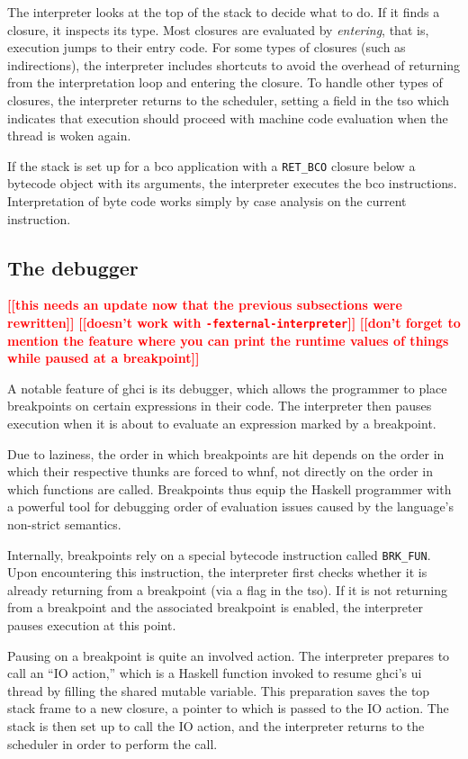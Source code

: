 \documentclass[thesis=B,english]{FITthesis}[2019/12/23]
\newcommand{\todo}[1]{\textcolor{red}{\textbf{[[#1]]}}}
\begin{document}
The interpreter looks at the top of the stack to decide what to do. If it finds
a closure, it inspects its type. Most closures are evaluated by
\textit{entering}, that is, execution jumps to their entry code. For some types
of closures (such as indirections), the interpreter includes shortcuts to avoid
the overhead of returning from the interpretation loop and entering the
closure. To handle other types of closures, the interpreter returns to the
scheduler, setting a field in the \acrshort{tso} which indicates that execution
should proceed with machine code evaluation when the thread is woken again.

If the stack is set up for a \acrshort{bco} application with a
\texttt{RET\_BCO} closure below a bytecode object with its arguments, the
interpreter executes the \acrshort{bco} instructions. Interpretation of byte
code works simply by case analysis on the current instruction.

\subsection*{The debugger}
\todo{this needs an update now that the previous subsections were rewritten}
\todo{doesn't work with \texttt{-fexternal-interpreter}}
\todo{don't forget to mention the feature where you can print the runtime
values of things while paused at a breakpoint}

A notable feature of \acrshort{ghci} is its debugger, which allows the
programmer to place breakpoints on certain expressions in their code. The
interpreter then pauses execution when it is about to evaluate an expression
marked by a breakpoint.

Due to laziness, the order in which breakpoints are hit depends on the order in
which their respective thunks are forced to \acrshort{whnf}, not directly on
the order in which functions are called. Breakpoints thus equip the Haskell
programmer with a powerful tool for debugging order of evaluation issues caused
by the language's non-strict semantics.

Internally, breakpoints rely on a special bytecode instruction called
\texttt{BRK\_FUN}. Upon encountering this instruction, the interpreter first
checks whether it is already returning from a breakpoint (via a flag in the
\acrshort{tso}). If it is not returning from a breakpoint and the associated
breakpoint is enabled, the interpreter pauses execution at this point.

Pausing on a breakpoint is quite an involved action. The interpreter prepares
to call an ``IO action,'' which is a Haskell function invoked to resume
\acrshort{ghci}'s \acrshort{ui} thread by filling the shared mutable variable.
This preparation saves the top stack frame to a new closure, a pointer to which
is passed to the IO action. The stack is then set up to call the IO action, and
the interpreter returns to the scheduler in order to perform the call.
\end{document}
